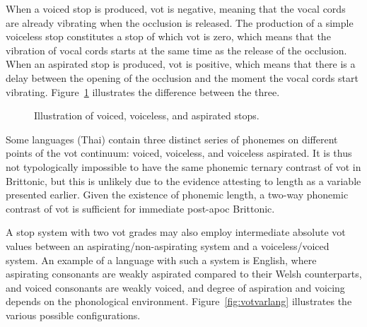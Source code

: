 When a voiced stop is produced, \gls{vot} is negative, meaning that the vocal cords are already vibrating when the occlusion is released. The production of a simple voiceless stop constitutes a stop of which \gls{vot} is  zero, which means that the vibration of vocal cords starts at the same time as the release of the occlusion. When an aspirated stop is produced, \gls{vot} is positive, which means that there is a delay between the opening of the occlusion and the moment the vocal cords start vibrating. Figure~\ref{fig:vvadiagram} illustrates the difference between the three.

\begin{figure}[h]
  \centering
  \caption{Illustration of voiced, voiceless, and aspirated stops.}
  \label{fig:vvadiagram}
\end{figure}
Some languages (\eg Thai) contain three distinct series of phonemes on different points of the \gls{vot} continuum: voiced, voiceless, and voiceless aspirated. It is thus not typologically impossible to have the same phonemic ternary contrast of \gls{vot} in Brittonic, but this is unlikely due to the evidence attesting to length as a variable presented earlier. Given the existence of phonemic length, a two-way phonemic contrast of \gls{vot} is sufficient for immediate post-\gls{apoc} Brittonic.



A stop system with two \gls{vot} grades may also employ intermediate absolute \gls{vot} values between an aspirating/non-aspirating system and a voiceless/voiced system. An example of a language with such a system is English, where aspirating consonants are weakly aspirated compared to their Welsh counterparts, and voiced consonants are weakly voiced, and degree of aspiration and voicing depends on the phonological environment. Figure~\ref{fig:votvarlang} illustrates the various possible configurations. 

